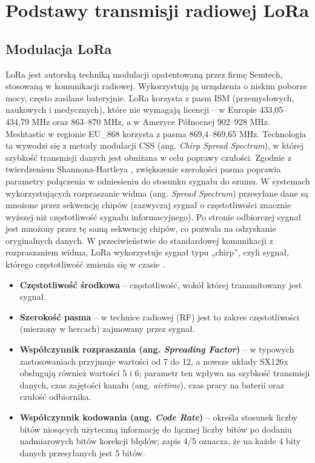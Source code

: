\documentclass[12pt,a4paper,twoside]{report}
\theoremstyle{definition} %
\begin{document}
    \cleardoublepage %


        \chapter{Podstawy transmisji radiowej LoRa}

\section{Modulacja LoRa}
LoRa jest autorską techniką modulacji opatentowaną przez firmę Semtech, stosowaną w komunikacji radiowej. Wykorzystują ją urządzenia o niskim poborze mocy, często zasilane bateryjnie. LoRa korzysta z pasm ISM (przemysłowych, naukowych i medycznych), które nie wymagają licencji – w Europie 433,05–434,79 MHz oraz 863–870 MHz, a w Ameryce Północnej 902–928 MHz. Meshtastic w regionie EU\_868 korzysta z pasma 869,4--869,65 MHz. Technologia ta wywodzi się z metody modulacji CSS (ang. \textit{Chirp Spread Spectrum}), w której szybkość transmisji danych jest obniżana w celu poprawy czułości. Zgodnie z twierdzeniem Shannona-Hartleya \cite{shannon1949}, zwiększenie szerokości pasma poprawia parametry połączenia w odniesieniu do stosunku sygnału do szumu. W systemach wykorzystujących rozpraszanie widma (ang. \textit{Spread Spectrum}) przesyłane dane są mnożone przez sekwencję chipów (zazwyczaj sygnał o częstotliwości znacznie wyższej niż częstotliwość sygnału informacyjnego). Po stronie odbiorczej sygnał jest mnożony przez tę samą sekwencję chipów, co pozwala na odzyskanie oryginalnych danych. W przeciwieństwie do standardowej komunikacji z rozpraszaniem widma, LoRa wykorzystuje sygnał typu „chirp”, czyli sygnał, którego częstotliwość zmienia się w czasie \cite{semtech_an1200_22}.

\begin{itemize}
    \item \textbf{Częstotliwość środkowa} – częstotliwość, wokół której transmitowany jest sygnał.
    \item \textbf{Szerokość pasma} – w technice radiowej (RF) jest to zakres częstotliwości (mierzony w hercach) zajmowany przez sygnał.
    \item \textbf{Współczynnik rozpraszania (ang. \textit{Spreading Factor})} – w typowych zastosowaniach przyjmuje wartości od 7 do 12, a nowsze układy SX126x obsługują również wartości 5 i 6; parametr ten wpływa na szybkość transmisji danych, czas zajętości kanału (ang. \textit{airtime}), czas pracy na baterii oraz czułość odbiornika.
    \item \textbf{Współczynnik kodowania (ang. \textit{Code Rate})} – określa stosunek liczby bitów niosących użyteczną informację do łącznej liczby bitów po dodaniu nadmiarowych bitów korekcji błędów; zapis 4/5 oznacza, że na każde 4 bity danych przesyłanych jest 5 bitów.
\end{itemize}
\end{document}

